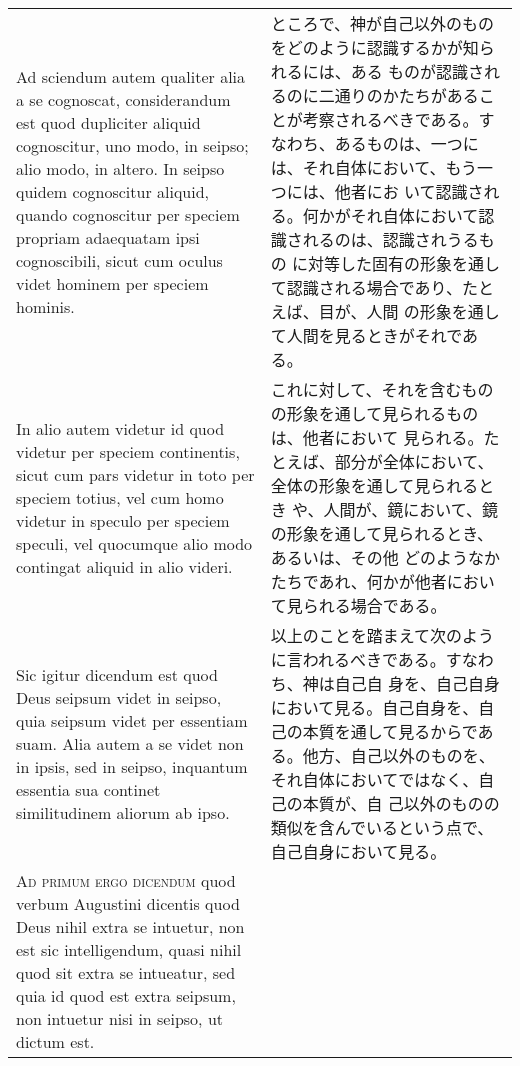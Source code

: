 \documentclass[10pt]{jsarticle} %
\begin{document}
\begin{longtable}{p{21em}p{21em}}
\\


Ad sciendum autem qualiter alia a
se cognoscat, considerandum est quod dupliciter aliquid cognoscitur, uno
modo, in seipso; alio modo, in altero. In seipso quidem cognoscitur
aliquid, quando cognoscitur per speciem propriam adaequatam ipsi
cognoscibili, sicut cum oculus videt hominem per speciem hominis. 


&

ところで、神が自己以外のものをどのように認識するかが知られるには、ある
ものが認識されるのに二通りのかたちがあることが考察されるべきである。す
なわち、あるものは、一つには、それ自体において、もう一つには、他者にお
いて認識される。何かがそれ自体において認識されるのは、認識されうるもの
に対等した固有の形象を通して認識される場合であり、たとえば、目が、人間
の形象を通して人間を見るときがそれである。


\\


In alio autem videtur id quod videtur per speciem continentis, sicut
cum pars videtur in toto per speciem totius, vel cum homo videtur in
speculo per speciem speculi, vel quocumque alio modo contingat aliquid
in alio videri.



&

これに対して、それを含むものの形象を通して見られるものは、他者において
見られる。たとえば、部分が全体において、全体の形象を通して見られるとき
や、人間が、鏡において、鏡の形象を通して見られるとき、あるいは、その他
どのようなかたちであれ、何かが他者において見られる場合である。

\\

Sic igitur dicendum est quod Deus seipsum videt in seipso, quia
seipsum videt per essentiam suam. Alia autem a se videt non in ipsis,
sed in seipso, inquantum essentia sua continet similitudinem aliorum
ab ipso.

&

以上のことを踏まえて次のように言われるべきである。すなわち、神は自己自
身を、自己自身において見る。自己自身を、自己の本質を通して見るからであ
る。他方、自己以外のものを、それ自体においてではなく、自己の本質が、自
己以外のものの類似を含んでいるという点で、自己自身において見る。



\\


{\scshape Ad primum ergo dicendum} quod verbum Augustini dicentis quod
Deus nihil extra se intuetur, non est sic intelligendum, quasi nihil
quod sit extra se intueatur, sed quia id quod est extra seipsum, non
intuetur nisi in seipso, ut dictum est.



\end{longtable}
\end{document}
